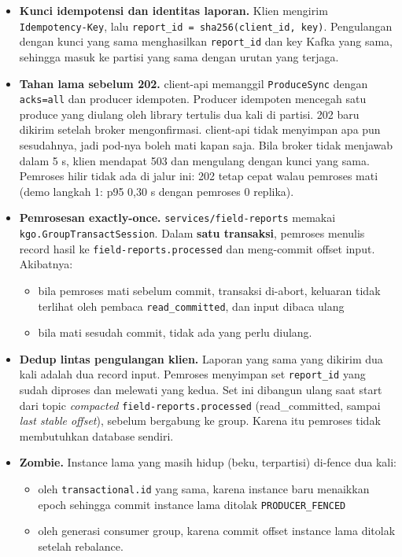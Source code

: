 \begin{itemize}
\item \textbf{Kunci idempotensi dan identitas laporan.} Klien mengirim \texttt{Idempotency-\allowbreak{}Key}, lalu \texttt{report\_\allowbreak{}id =\allowbreak{} sha256(client\_\allowbreak{}id,\allowbreak{} key)}. Pengulangan dengan kunci yang sama menghasilkan \texttt{report\_\allowbreak{}id} dan key Kafka yang sama, sehingga masuk ke partisi yang sama dengan urutan yang terjaga.
\item \textbf{Tahan lama sebelum 202.} client-api memanggil \texttt{Produce\allowbreak{}Sync} dengan \texttt{acks=\allowbreak{}all} dan producer idempoten. Producer idempoten mencegah satu produce yang diulang oleh library tertulis dua kali di partisi. 202 baru dikirim setelah broker mengonfirmasi. client-api tidak menyimpan apa pun sesudahnya, jadi pod-nya boleh mati kapan saja. Bila broker tidak menjawab dalam 5 s, klien mendapat 503 dan mengulang dengan kunci yang sama. Pemroses hilir tidak ada di jalur ini: 202 tetap cepat walau pemroses mati (demo langkah 1: p95 0,30 s dengan pemroses 0 replika).
\item \textbf{Pemrosesan exactly-once.} \texttt{services/\allowbreak{}field-\allowbreak{}reports} memakai \texttt{kgo.\allowbreak{}Group\allowbreak{}Transact\allowbreak{}Session}. Dalam \textbf{satu transaksi}, pemroses menulis record hasil ke \texttt{field-\allowbreak{}reports.\allowbreak{}processed} dan meng-commit offset input. Akibatnya:
\begin{itemize}
\item bila pemroses mati sebelum commit, transaksi di-abort, keluaran tidak terlihat oleh pembaca \texttt{read\_\allowbreak{}committed}, dan input dibaca ulang
\item bila mati sesudah commit, tidak ada yang perlu diulang.
\end{itemize}
\item \textbf{Dedup lintas pengulangan klien.} Laporan yang sama yang dikirim dua kali adalah dua record input. Pemroses menyimpan set \texttt{report\_\allowbreak{}id} yang sudah diproses dan melewati yang kedua. Set ini dibangun ulang saat start dari topic \emph{compacted} \texttt{field-\allowbreak{}reports.\allowbreak{}processed} (read\_committed, sampai \emph{last stable offset}), sebelum bergabung ke group. Karena itu pemroses tidak membutuhkan database sendiri.
\item \textbf{Zombie.} Instance lama yang masih hidup (beku, terpartisi) di-fence dua kali:
\begin{itemize}
\item oleh \texttt{transactional.\allowbreak{}id} yang sama, karena instance baru menaikkan epoch sehingga commit instance lama ditolak \texttt{PRODUCER\_\allowbreak{}FENCED}
\item oleh generasi consumer group, karena commit offset instance lama ditolak setelah rebalance.


\end{itemize}
\end{itemize}
